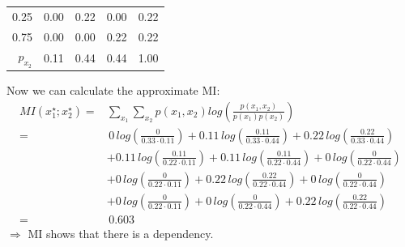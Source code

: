 {\begin{enumerate}[a)]
\begin{table}[H]
\begin{tabular}{r|rrr|r}
  		0.25 & 0.00 & 0.22 & 0.00 & 0.22 \\ 
  		0.75 & 0.00 & 0.00 & 0.22 & 0.22 \\
  		\hline 
  		$p_{x_2}$& 0.11 & 0.44 & 0.44 & 1.00 \\ 
  		\hline
  	\end{tabular}
  \end{table}
Now we can calculate the approximate MI: 
   \begin{align*}
   	MI(x_1^\star ; x_2^\star) = & \sum_{x_1} \sum_{x_2} p(x_1, x_2) log\left(\frac{p(x_1, x_2)}{p(x_1) p(x_2)} \right)\\
 	=& \,0\, log\left(\frac{0}{0.33 \cdot 0.11} \right) 
   	+ 0.11\, log\left(\frac{0.11}{0.33 \cdot 0.44} \right) 
   	+ 0.22\, log\left(\frac{0.22}{0.33 \cdot 0.44} \right) \\
   	&+ 0.11\, log\left(\frac{0.11}{0.22 \cdot 0.11} \right)
   	+ 0.11\, log\left(\frac{0.11}{0.22 \cdot 0.44} \right) 
   	+ 0\, log\left(\frac{0}{0.22 \cdot 0.44} \right) \\
   	&+ 0\, log\left(\frac{0}{0.22 \cdot 0.11} \right)
   	+ 0.22\, log\left(\frac{0.22}{0.22 \cdot 0.44} \right) 
   	+ 0\, log\left(\frac{0}{0.22 \cdot 0.44} \right) \\
   	&+ 0\, log\left(\frac{0}{0.22 \cdot 0.11} \right)
   	+ 0\, log\left(\frac{0}{0.22 \cdot 0.44} \right) 
   	+ 0.22\, log\left(\frac{0.22}{0.22 \cdot 0.44} \right) \\
   	= & \, 0.603
   \end{align*}
$\Rightarrow$ MI shows that there is a dependency.
  
 
  
\end{enumerate}
}
